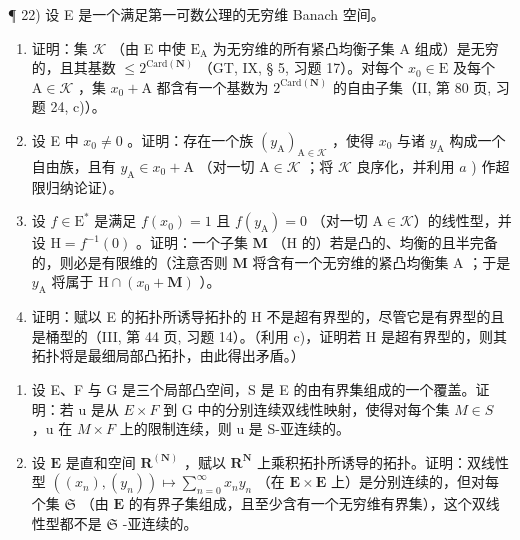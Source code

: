¶ 22) 设 E 是一个满足第一可数公理的无穷维 Banach 空间。

\begin{enumerate}
\def\labelenumi{\alph{enumi})}
\item
  证明：集 \(\mathcal{K}\) （由 E 中使 \(\mathrm{E_A}\) 为无穷维的所有紧凸均衡子集 A 组成）是无穷的，且其基数 \(\leqslant 2^{\mathrm{Card}(\mathbf{N})}\) （GT, IX, § 5, 习题 17）。对每个 \(x_0 \in \mathrm{E}\) 及每个 \(\mathrm{A} \in \mathcal{K}\) ，集 \(x_0 + \mathrm{A}\) 都含有一个基数为 \(2^{\mathrm{Card}(\mathbf{N})}\) 的自由子集（II, 第 80 页, 习题 24, c)）。
\item
  设 E 中 \(x_0 \neq 0\) 。证明：存在一个族 \((y_{\mathrm{A}})_{\mathrm{A} \in \mathcal{K}}\) ，使得 \(x_0\) 与诸 \(y_{\mathrm{A}}\) 构成一个自由族，且有 \(y_{\mathrm{A}} \in x_0 + \mathrm{A}\) （对一切 \(\mathrm{A} \in \mathcal{K}\) ；将 \(\mathcal{K}\) 良序化，并利用 \(a\) ) 作超限归纳论证）。
\item
  设 \(f \in \mathrm{E}^{*}\) 是满足 \(f(x_0) = 1\) 且 \(f(y_{\mathrm{A}}) = 0\) （对一切 \(\mathrm{A} \in \mathcal{K}\)）的线性型，并设 \(\mathrm{H} = f^{-1}(0)\) 。证明：一个子集 \(\mathbf{M}\) （\(\mathrm{H}\) 的）若是凸的、均衡的且半完备的，则必是有限维的（注意否则 \(\mathbf{M}\) 将含有一个无穷维的紧凸均衡集 \(\mathrm{A}\) ；于是 \(y_{\mathrm{A}}\) 将属于 \(\mathrm{H} \cap (x_0 + \mathbf{M})\) ）。
\item
  证明：赋以 E 的拓扑所诱导拓扑的 H 不是超有界型的，尽管它是有界型的且是桶型的（III, 第 44 页, 习题 14）。（利用 c)，证明若 H 是超有界型的，则其拓扑将是最细局部凸拓扑，由此得出矛盾。）
\end{enumerate}

\exercisegroup

\begin{enumerate}
\def\labelenumi{\arabic{enumi})}
\item
  设 E、F 与 G 是三个局部凸空间，S 是 E 的由有界集组成的一个覆盖。证明：若 u 是从 \(E \times F\) 到 G 中的分别连续双线性映射，使得对每个集 \(M \in S\) ，u 在 \(M \times F\) 上的限制连续，则 u 是 S-亚连续的。
\item
  设 \(\mathbf{E}\) 是直和空间 \(\mathbf{R}^{(\mathbf{N})}\) ，赋以 \(\mathbf{R}^{\mathbf{N}}\) 上乘积拓扑所诱导的拓扑。证明：双线性型 \(((x_n), (y_n)) \mapsto \sum_{n=0}^{\infty} x_n y_n\) （在 \(\mathbf{E} \times \mathbf{E}\) 上）是分别连续的，但对每个集 \(\mathfrak{S}\) （由 \(\mathbf{E}\) 的有界子集组成，且至少含有一个无穷维有界集），这个双线性型都不是 \(\mathfrak{S}\) -亚连续的。
\end{enumerate}


